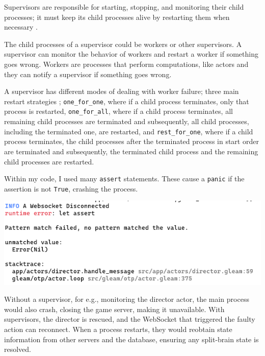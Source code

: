 \documentclass[]{final}
\begin{document}
\newpage

Supervisors are responsible for starting, stopping, and monitoring their child
processes; it must keep its child processes alive by restarting them when
necessary \cite{noauthor_gleam-otp-design-principals/gleam-otp-design-principals.org_nodate, noauthor_supervisor_nodate}.

The child processes of a supervisor could be workers or other supervisors.
A supervisor can monitor the behavior of workers and restart a worker if something
goes wrong.
Workers are processes that perform computations, like actors and they can
notify a supervisor if something goes wrong.

A supervisor has different modes of dealing with worker failure; three main
restart strategies \cite{noauthor_supervisor_nodate};
\lstinline|one_for_one|, where if a child process terminates, only that process
is restarted, \lstinline|one_for_all|, where
if a child process terminates, all remaining child processes are terminated and
subsequently, all child processes, including the terminated one, are restarted,
and \lstinline|rest_for_one|, where
if a child process terminates, the child processes after the terminated process
in start order are terminated and subsequently, the terminated child
process and the remaining child processes are restarted.

\noindent
\begin{minipage}{18em}
  Within my code, I used many \lstinline|assert| statements. These cause
  a \lstinline|panic| if the assertion is not \lstinline|True|, crashing the
  process.
\end{minipage}
\hfill
\begin{minipage}{20em}
  \includegraphics[width=\linewidth]{assert_panic}
  \label{fig: 20}
\end{minipage}

Without a supervisor, for e.g., monitoring the director actor, the main process would
also crash, closing the game server, making it unavailable. With supervisors, the director is rescued, and the WebSocket that triggered
the faulty action can reconnect. When a process restarts,
they would reobtain state information from other servers and the database,
ensuring any split-brain state is resolved.
\end{document}
